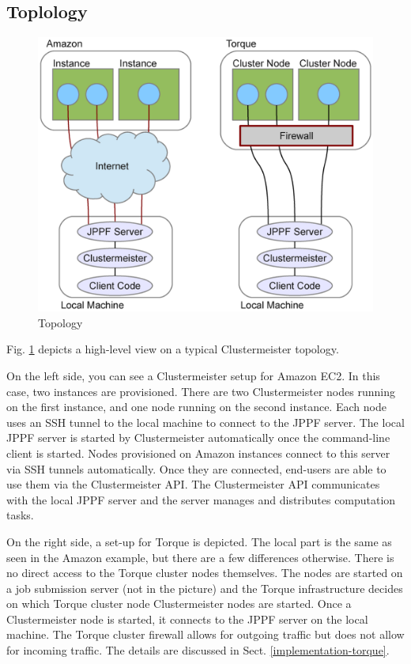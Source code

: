 \documentclass[12pt]{article}
\begin{document}
\subsection{Toplology}
\label{topology}

\begin{figure}[h]
\centering
\includegraphics[scale=0.5]{images/topology.pdf}
\caption{Topology}
\label{fig:topology}
\end{figure}

Fig. \ref{fig:topology} depicts a high-level view on a typical Clustermeister topology.

On the left side, you can see a Clustermeister setup for Amazon EC2. In this case, two instances are provisioned. There are two Clustermeister nodes running on the first instance, and one node running on the second instance. Each node uses an SSH tunnel to the local machine to connect to the JPPF server. The local JPPF server is started by Clustermeister automatically once the command-line client is started. Nodes provisioned on Amazon instances connect to this server via SSH tunnels automatically. Once they are connected, end-users are able to use them via the Clustermeister API. The Clustermeister API communicates with the local JPPF server and the server manages and distributes computation tasks.

On the right side, a set-up for Torque is depicted. The local part is the same as seen in the Amazon example, but there are a few differences otherwise. There is no direct access to the Torque cluster nodes themselves. The nodes are started on a job submission server (not in the picture) and the Torque infrastructure decides on which Torque cluster node Clustermeister nodes are started. Once a Clustermeister node is started, it connects to the JPPF server on the local machine. The Torque cluster firewall allows for outgoing traffic but does not allow for incoming traffic. The details are discussed in Sect. \ref{implementation-torque}.
\end{document}
